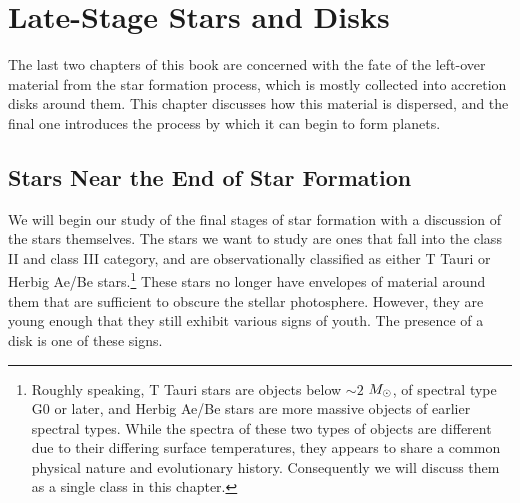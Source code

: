 \chapter{Late-Stage Stars and Disks}
\label{ch:late_disk}


The last two chapters of this book are concerned with the fate of the left-over material from the star formation process, which is mostly collected into accretion disks around them. This chapter discusses how this material is dispersed, and the final one introduces the process by which it can begin to form planets.

\section{Stars Near the End of Star Formation}

We will begin our study of the final stages of star formation with a discussion of the stars themselves. The stars we want to study are ones that fall into the class II and class III category, and are observationally classified as either T Tauri or Herbig Ae/Be stars.\footnote{Roughly speaking, T Tauri stars are objects below $\sim 2$ $M_{\odot}$, of spectral type G0 or later, and Herbig Ae/Be stars are more massive objects of earlier spectral types. While the spectra of these two types of objects are different due to their differing surface temperatures, they appears to share a common physical nature and evolutionary history. Consequently we will discuss them as a single class in this chapter.} These stars no longer have envelopes of material around them that are sufficient to obscure the stellar photosphere. However, they are young enough that they still exhibit various signs of youth. The presence of a disk is one of these signs.


